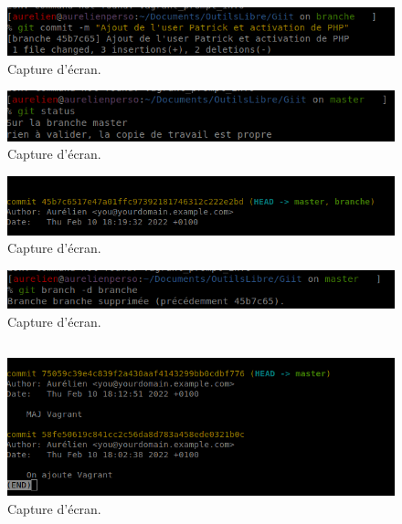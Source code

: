 \documentclass{article}
\begin{document}
\begin{figure}[h]
\centering
\includegraphics[width=0.7\columnwidth]{screen/git2_2.png}
\caption{\label{fig:frog}Capture d'écran.}
\end{figure}

\begin{figure}[h]
\centering
\includegraphics[width=0.7\columnwidth]{screen/git2_3.png}
\caption{\label{fig:frog}Capture d'écran.}
\end{figure}

\begin{figure}[h]
\centering
\includegraphics[width=\textwidth]{screen/git2_4.png}
\caption{\label{fig:frog}Capture d'écran.}
\end{figure}

\begin{figure}[h]
\centering
\includegraphics[width=0.7\columnwidth]{screen/git2_5.png}
\caption{\label{fig:frog}Capture d'écran.}
\end{figure}

\subsection{}

\begin{figure}[h]
\centering
\includegraphics[width=0.7\columnwidth]{screen/git3.png}
\caption{\label{fig:frog}Capture d'écran.}
\end{figure}
\end{document}
